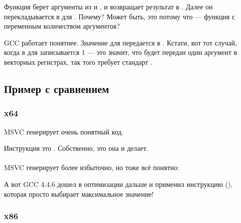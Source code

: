 Функция  берет аргументы из  и , 
и возвращает результат в .
Далее он перекладывается в \RDX для \printf. 
Почему? 
Может быть, это потому что 
\printf --- функция с переменным количеством аргументов?



GCC работает понятнее. 
Значение для \printf передается в . 
Кстати, вот тот случай, когда в \EAX
для \printf записывается 1 --- это значит, что будет передан один аргумент в векторных регистрах, 
так того требует стандарт \SysVABI.

\subsection{Пример с сравнением}



\subsubsection{x64}



\Optimizing MSVC генерирует очень понятный код.

Инструкция  это . Собственно, это она и делает.\\
\\
\NonOptimizing MSVC генерирует более избыточно, но тоже всё понятно:



А вот GCC 4.4.6 дошел в оптимизации дальше и применил инструкцию  (), которая просто выбирает максимальное значение!



\clearpage
\subsubsection{x86}


